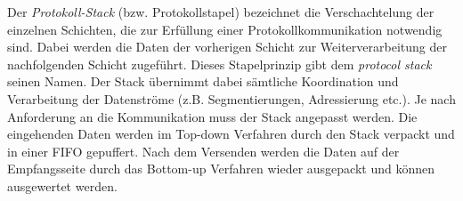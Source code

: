Der \textit{Protokoll-Stack} (bzw. Protokollstapel) bezeichnet die
Verschachtelung der einzelnen Schichten, die zur Erf{\"u}llung einer
Protokollkommunikation notwendig sind. Dabei werden die Daten der vorherigen
Schicht zur Weiterverarbeitung der nachfolgenden Schicht zugef{\"u}hrt. Dieses
Stapelprinzip gibt dem \textit{protocol stack} seinen Namen. Der Stack
{\"u}bernimmt dabei s{\"a}mtliche Koordination und Verarbeitung der
Datenstr{\"o}me (z.B. Segmentierungen, Adressierung etc.).
Je nach Anforderung an die Kommunikation muss der Stack angepasst werden. Die
eingehenden Daten werden im Top-down Verfahren durch den Stack verpackt
und in einer \gls{FIFO} gepuffert. Nach dem Versenden werden die
Daten auf der Empfangsseite durch das Bottom-up Verfahren wieder ausgepackt und k{\"o}nnen
ausgewertet werden.
